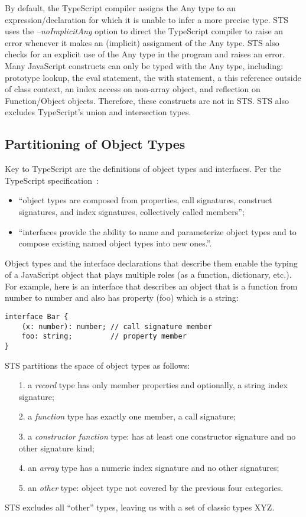 By default, the TypeScript compiler assigns the Any type to an expression/declaration for which it is unable to 
infer a more precise type. STS uses the \emph{--noImplicitAny} option to direct the TypeScript compiler to raise an error 
whenever it makes an (implicit) assignment of the Any type.  STS also checks for an explicit use of the Any type in
the program and raises an error. Many JavaScript constructs can only be typed with the Any type, including: prototype lookup,
the eval statement, the with statement, a this reference outside of class context, an index access on non-array object, and
reflection on Function/Object objects. Therefore, these constructs are not in STS.
STS also excludes TypeScript’s union and intersection types.

\subsection{Partitioning of Object Types}

Key to TypeScript are the definitions of object types and interfaces. Per the TypeScript specification~\cite{XYZ}:
\begin{itemize}
\item ``object types are composed from properties, call signatures, construct signatures, and index signatures, collectively called members'';
\item ``interfaces provide the ability to name and parameterize object types and to compose existing named object types into new ones.''.
\end{itemize} 
Object types and the interface declarations that describe them enable the typing of a JavaScript object that plays multiple roles
(as a function, dictionary, etc.). For example, here is an interface that describes an object that is a function from number to number
and also has property (foo) which is a string:
\begin{lstlisting}
interface Bar {
    (x: number): number; // call signature member
    foo: string;         // property member
}
\end{lstlisting}
STS partitions the space of object types as follows:
\begin{itemize}
\item[1.] a \emph{record} type has only member properties and optionally, a string index signature;
\item[2.] a \emph{function} type has exactly one member, a call signature;
\item[3.] a \emph{constructor function} type: has at least one constructor signature and no other signature kind;
\item[4.] an \emph{array} type has a numeric index signature and no other signatures;
\item[5.] an \emph{other} type: object type not covered by the previous four categories.
\end{itemize}
STS excludes all ``other'' types, leaving us with a set of classic types XYZ.             

